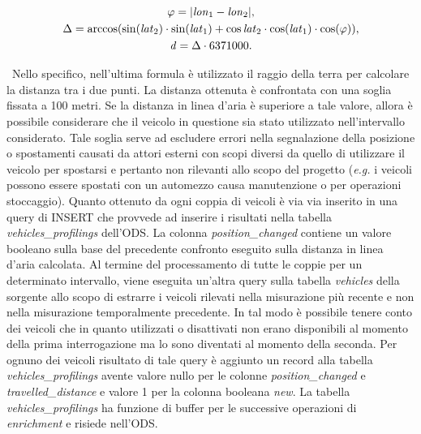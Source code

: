 \begin{gather}
\varphi = \lvert\mathit{lon}_1 - \mathit{lon}_2\rvert, \notag \\
\Delta = \arccos(\sin(\mathit{lat}_2) \cdot \sin(\mathit{lat}_1) + \cos{\mathit{lat}_2} \cdot \cos(\mathit{lat}_1) \cdot \cos(\varphi)), \notag \\
\mathit{d} = \Delta \cdot 6371000. \notag
\end{gather}

\noindent~Nello specifico, nell'ultima formula è utilizzato il raggio della
terra per calcolare la distanza tra i due punti. La distanza ottenuta è
confrontata con una soglia fissata a 100 metri. Se la distanza in linea d'aria
è superiore a tale valore, allora è possibile considerare che il veicolo in
questione sia stato utilizzato nell'intervallo considerato. Tale soglia serve
ad escludere errori nella segnalazione della posizione o spostamenti causati da
attori esterni con scopi diversi da quello di utilizzare il veicolo per spostarsi 
e pertanto non rilevanti allo scopo del progetto (\textit{e.g.} i veicoli possono essere spostati con un automezzo causa manutenzione o per operazioni stoccaggio). 
Quanto ottenuto da ogni coppia di veicoli è via via inserito in una query di INSERT che provvede ad inserire i risultati
nella tabella \textit{vehicles\_profilings} dell'ODS.
La colonna \textit{position\_changed} contiene un valore booleano sulla base
del precedente confronto eseguito sulla distanza in linea d'aria calcolata.
Al termine del processamento di tutte le coppie per un determinato intervallo,
viene eseguita un'altra query sulla tabella \textit{vehicles} della sorgente allo 
scopo di estrarre i veicoli rilevati nella misurazione più recente e non nella  
misurazione temporalmente precedente. In tal modo è possibile tenere conto dei
veicoli che in quanto utilizzati o disattivati non erano disponibili al momento 
della prima interrogazione ma lo sono diventati al momento della seconda. Per 
ognuno dei veicoli risultato di tale query è aggiunto un record alla tabella
\textit{vehicles\_profilings} avente valore nullo per le colonne 
\textit{position\_changed} e \textit{travelled\_distance} e valore
1 per la colonna booleana \textit{new}. La tabella \textit{vehicles\_profilings}
ha funzione di buffer per le successive operazioni di \textit{enrichment} e risiede
nell'ODS.

